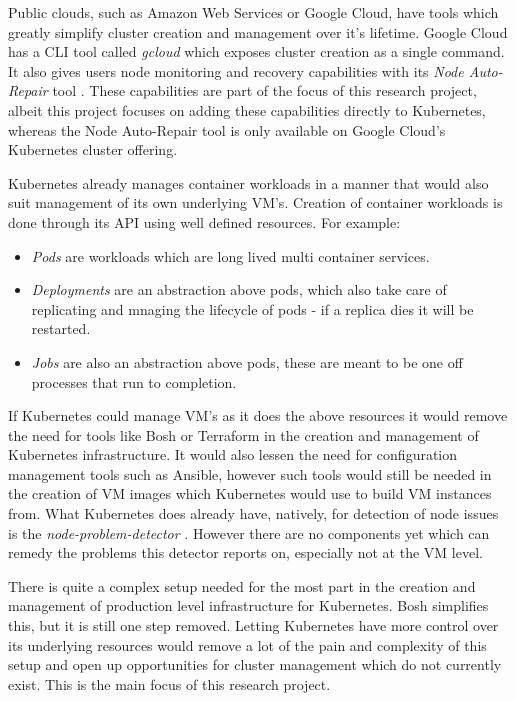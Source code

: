 Public clouds, such as Amazon Web Services or Google Cloud, have tools which greatly simplify cluster creation and management over it's lifetime. Google Cloud has a CLI tool called \emph{gcloud} which exposes cluster creation as a single command. It also gives users node monitoring and recovery capabilities with its \emph{Node Auto-Repair} tool \cite{noderepair}. These capabilities are part of the focus of this research project, albeit this project focuses on adding these capabilities directly to Kubernetes, whereas the Node Auto-Repair tool is only available on Google Cloud's Kubernetes cluster offering.

Kubernetes already manages container workloads in a manner that would also suit management of its own underlying VM's. Creation of container workloads is done through its API using well defined resources. For example:

\begin{itemize}
  \item \emph{Pods} are workloads which are long lived multi container services.
  \item \emph{Deployments} are an abstraction above pods, which also take care of replicating and mnaging the lifecycle of pods - if a replica dies it will be restarted.
  \item \emph{Jobs} are also an abstraction above pods, these are meant to be one off processes that run to completion.
\end{itemize}

If Kubernetes could manage VM's as it does the above resources it would remove the need for tools like Bosh or Terraform in the creation and management of Kubernetes infrastructure. It would also lessen the need for configuration management tools such as Ansible, however such tools would still be needed in the creation of VM images which Kubernetes would use to build VM instances from. What Kubernetes does already have, natively, for detection of node issues is the \emph{node-problem-detector} \cite{nodeprob}. However there are no components yet which can remedy the problems this detector reports on, especially not at the VM level.

There is quite a complex setup needed for the most part in the creation and management of production level infrastructure for Kubernetes. Bosh simplifies this, but it is still one step removed. Letting Kubernetes have more control over its underlying resources would remove a lot of the pain and complexity of this setup and open up opportunities for cluster management which do not currently exist. This is the main focus of this research project.
